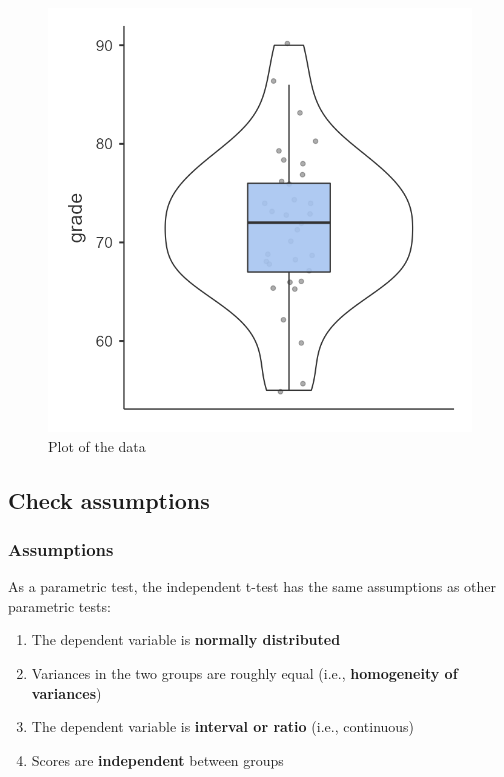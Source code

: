 \documentclass[
]{book}
\begin{document}
\begin{figure}

{\centering \includegraphics[width=0.8\linewidth]{images/02-independent_t-test/independent_t-test_plot_all} 

}

\caption{Plot of the data}\label{fig:unnamed-chunk-3}
\end{figure}

\hypertarget{check-assumptions-1}{%
\subsection{Check assumptions}\label{check-assumptions-1}}

\hypertarget{assumptions-1}{%
\subsubsection{Assumptions}\label{assumptions-1}}

As a parametric test, the independent t-test has the same assumptions as other parametric tests:

\begin{enumerate}
\def\labelenumi{\arabic{enumi}.}
\item
  The dependent variable is \textbf{normally distributed}
\item
  Variances in the two groups are roughly equal (i.e., \textbf{homogeneity of variances})
\item
  The dependent variable is \textbf{interval or ratio} (i.e., continuous)
\item
  Scores are \textbf{independent} between groups
\end{enumerate}
\end{document}

